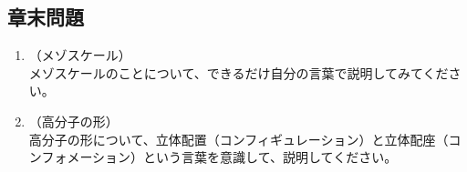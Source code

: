 \documentclass[a4paper,11pt]{ltjsarticle}
\begin{document}
\subsection{章末問題}

	\begin{enumerate}
		\item
		（メゾスケール）\\
		メゾスケールのことについて、できるだけ自分の言葉で説明してみてください。
		\item
		（高分子の形）\\
		高分子の形について、立体配置（コンフィギュレーション）と立体配座（コンフォメーション）という言葉を意識して、説明してください。

	\end{enumerate}
\end{document}
